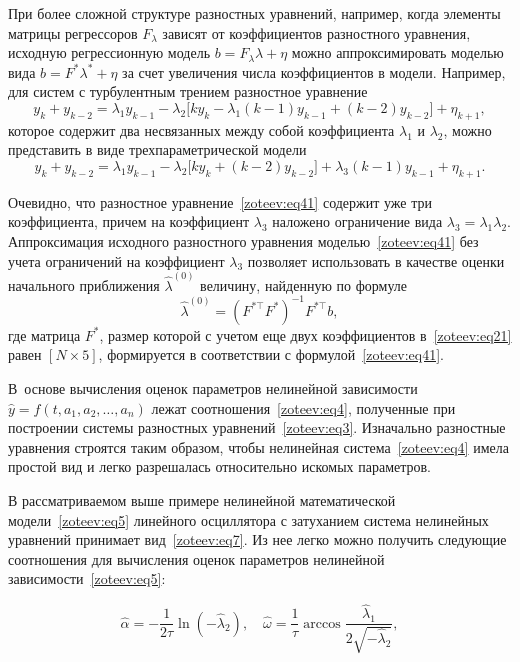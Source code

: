 При более сложной структуре разностных уравнений, например, когда элементы матрицы регрессоров $F_\lambda$ зависят от коэффициентов разностного уравнения, исходную регрессионную модель $b=F_\lambda \lambda + \eta$ можно аппроксимировать моделью вида $b=F^{*}\lambda^{*}+\eta$ за счет увеличения числа коэффициентов в модели. Например, для систем с турбулентным трением разностное уравнение 
$$
y_k+y_{k-2}=\lambda_1y_{k-1}-\lambda_2\big[ky_k-\lambda_1(k-1)y_{k-1}+(k-2)y_{k-2}\big]+\eta_{k+1},
$$
которое содержит два несвязанных между собой коэффициента $\lambda_1$ и $\lambda_2$, можно представить в виде трехпараметрической модели
\begin{equation}
y_k+y_{k-2}=\lambda_1y_{k-1}-\lambda_2\big[ky_k+(k-2)y_{k-2}\big]+\lambda_3(k-1)y_{k-1}+\eta_{k+1}.
\label{zoteev:eq41}
\end{equation}

Очевидно, что разностное уравнение~\eqref{zoteev:eq41} содержит уже три коэффициента, причем на коэффициент $\lambda_3$ наложено ограничение вида $\lambda_3=\lambda_1\lambda_2$. Аппроксимация исходного разностного уравнения моделью~\eqref{zoteev:eq41} без учета ограничений на коэффициент $\lambda_3$ позволяет использовать в качестве оценки начального приближения $\hat{\lambda}^{(0)}$ величину, найденную по формуле $$\hat{\lambda}^{(0)}=(F^{*\top}F^{*})^{-1}F^{*\top}b,$$ 
где матрица $F^{*}$, размер которой с учетом еще двух коэффициентов в~\eqref{zoteev:eq21} равен $[N {\times} 5]$, формируется в соответствии с формулой~\eqref{zoteev:eq41}.

\smallskip

В~основе вычисления оценок параметров нелинейной зависимости $\hat{y}=f(t,a_1,a_2,\dots,a_n)$ лежат соотношения~\eqref{zoteev:eq4}, полученные при построении системы разностных уравнений~\eqref{zoteev:eq3}. Изначально разностные уравнения строятся таким образом, чтобы нелинейная система~\eqref{zoteev:eq4} имела простой вид и легко разрешалась относительно искомых параметров.

В рассматриваемом выше примере нелинейной математической модели~\eqref{zoteev:eq5} линейного осциллятора с затуханием система нелинейных уравнений принимает вид~\eqref{zoteev:eq7}. Из нее легко можно получить следующие соотношения для вычисления оценок параметров нелинейной зависимости~\eqref{zoteev:eq5}:

\begin{equation*}
\hat{\alpha}=-\dfrac{1}{2\tau}\ln (-\hat{\lambda}_2), \quad \hat{\omega}=\dfrac{1}{\tau}\arccos \dfrac{\hat{\lambda}_1}{2\sqrt{-\hat{\lambda}_2}},
\label{zoteev:eq42}
\end{equation*}

